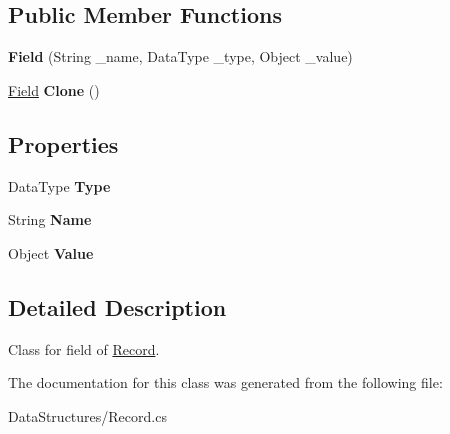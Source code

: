 \subsection*{Public Member Functions}
\begin{DoxyCompactItemize}
\item 
\hypertarget{class_dwarf_d_b_1_1_data_structures_1_1_field_af89ec8a20b69b0f52e56c7730eb8127a}{
{\bfseries Field} (String \_\-name, DataType \_\-type, Object \_\-value)}
\label{class_dwarf_d_b_1_1_data_structures_1_1_field_af89ec8a20b69b0f52e56c7730eb8127a}

\item 
\hypertarget{class_dwarf_d_b_1_1_data_structures_1_1_field_a4772b2645a7b03be6800261db6a3c816}{
\hyperlink{class_dwarf_d_b_1_1_data_structures_1_1_field}{Field} {\bfseries Clone} ()}
\label{class_dwarf_d_b_1_1_data_structures_1_1_field_a4772b2645a7b03be6800261db6a3c816}

\end{DoxyCompactItemize}
\subsection*{Properties}
\begin{DoxyCompactItemize}
\item 
\hypertarget{class_dwarf_d_b_1_1_data_structures_1_1_field_a147e0dff27a89485bf91437d931fe5b5}{
DataType {\bfseries Type}}
\label{class_dwarf_d_b_1_1_data_structures_1_1_field_a147e0dff27a89485bf91437d931fe5b5}

\item 
\hypertarget{class_dwarf_d_b_1_1_data_structures_1_1_field_a5c1af79be209e13f5da11e4c033f1fdb}{
String {\bfseries Name}}
\label{class_dwarf_d_b_1_1_data_structures_1_1_field_a5c1af79be209e13f5da11e4c033f1fdb}

\item 
\hypertarget{class_dwarf_d_b_1_1_data_structures_1_1_field_ac7d7ebd43b9010ed2a7767a296e90d6f}{
Object {\bfseries Value}}
\label{class_dwarf_d_b_1_1_data_structures_1_1_field_ac7d7ebd43b9010ed2a7767a296e90d6f}

\end{DoxyCompactItemize}


\subsection{Detailed Description}
Class for field of \hyperlink{class_dwarf_d_b_1_1_data_structures_1_1_record}{Record}. 

The documentation for this class was generated from the following file:\begin{DoxyCompactItemize}
\item 
DataStructures/Record.cs\end{DoxyCompactItemize}
